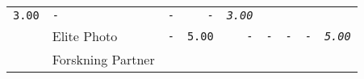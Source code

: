 \documentclass[11pt,A4paper,]{article}
\begin{document}
\begin{longtable}[]{@{}llrrrrrrr@{}}
\begin{minipage}[t]{0.11\columnwidth}
\texttt{3.00}\strut
\end{minipage} & \begin{minipage}[t]{0.11\columnwidth}\raggedleft\strut
\texttt{-}\strut
\end{minipage} & \begin{minipage}[t]{0.11\columnwidth}\raggedleft\strut
\texttt{-}\strut
\end{minipage} & \begin{minipage}[t]{0.11\columnwidth}\raggedleft\strut
\texttt{-}\strut
\end{minipage} & \begin{minipage}[t]{0.11\columnwidth}\raggedleft\strut
\emph{\texttt{3.00}}\strut
\end{minipage}\tabularnewline
\begin{minipage}[t]{0.11\columnwidth}\raggedright\strut
\strut
\end{minipage} & \begin{minipage}[t]{0.11\columnwidth}\raggedright\strut
Elite Photo\strut
\end{minipage} & \begin{minipage}[t]{0.11\columnwidth}\raggedleft\strut
\texttt{-}\strut
\end{minipage} & \begin{minipage}[t]{0.11\columnwidth}\raggedleft\strut
\texttt{5.00}\strut
\end{minipage} & \begin{minipage}[t]{0.11\columnwidth}\raggedleft\strut
\texttt{-}\strut
\end{minipage} & \begin{minipage}[t]{0.11\columnwidth}\raggedleft\strut
\texttt{-}\strut
\end{minipage} & \begin{minipage}[t]{0.11\columnwidth}\raggedleft\strut
\texttt{-}\strut
\end{minipage} & \begin{minipage}[t]{0.11\columnwidth}\raggedleft\strut
\texttt{-}\strut
\end{minipage} & \begin{minipage}[t]{0.11\columnwidth}\raggedleft\strut
\emph{\texttt{5.00}}\strut
\end{minipage}\tabularnewline
\begin{minipage}[t]{0.11\columnwidth}\raggedright\strut
\strut
\end{minipage} & \begin{minipage}[t]{0.11\columnwidth}\raggedright\strut
Forskning Partner\strut
\end{minipage} & \begin{minipage}[t]{0.11\columnwidth}\raggedleft\strut

\end{minipage}
\end{longtable}
\end{document}
